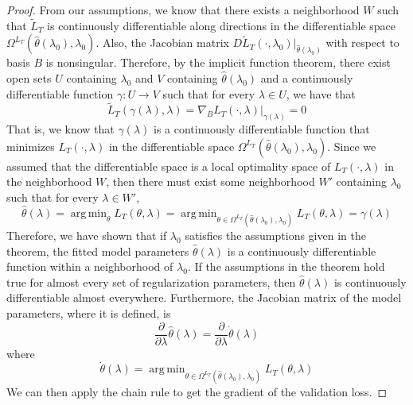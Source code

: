 \documentclass[10pt,letterpaper]{article}
\DeclareMathOperator*{\argmin}{arg\,min}
\begin{document}
\begin{proof}
From our assumptions, we know that there exists a neighborhood $W$ such that $\tilde L_T$ is continuously differentiable along directions in the differentiable space $\Omega^{L_T}(\hat \theta(\lambda_0), \lambda_0)$. Also, the Jacobian matrix $D \tilde L_T(\cdot, \lambda_0)|_{\hat \theta(\lambda_0)}$ with respect to basis $B$ is nonsingular. Therefore, by the implicit function theorem, there exist open sets $U$ containing $\lambda_0$ and $V$ containing $\hat \theta(\lambda_0)$ and a continuously differentiable function $\gamma: U \rightarrow V$ such that for every $\lambda \in U$, we have that 
\begin{equation}
\tilde L_T(\gamma(\lambda), \lambda) = \nabla_{B} L_T(\cdot, \lambda)|_{\gamma(\lambda)} = 0
\end{equation}
That is, we know that $\gamma(\lambda)$ is a continuously differentiable function that minimizes $L_T(\cdot, \lambda)$ in the differentiable space  $\Omega^{L_T}(\hat \theta(\lambda_0), \lambda_0)$.
Since we assumed that the differentiable space is a local optimality space of $L_T(\cdot, \lambda)$ in the neighborhood $W$, then there must exist some neighborhood $W'$ containing $\lambda_0$ such that for every $\lambda \in W'$, 
\begin{equation}
\hat \theta(\lambda) =
\argmin_\theta L_T(\theta, \lambda) =
\argmin_{\theta \in \Omega^{L_T}(\hat \theta(\lambda_0), \lambda_0)} L_T(\theta, \lambda) =
\gamma(\lambda)
\end{equation}
Therefore, we have shown that if $\lambda_0$ satisfies the assumptions given in the theorem, the fitted model parameters $\hat \theta(\lambda)$ is a continuously differentiable function within a neighborhood of $\lambda_0$. If the assumptions in the theorem hold true for almost every set of regularization parameters, then $\hat \theta(\lambda)$ is continuously differentiable almost everywhere. Furthermore, the Jacobian matrix of the model parameters, where it is defined, is
\begin{equation}
\frac{\partial}{\partial \lambda} \hat \theta(\lambda) = \frac{\partial}{\partial \lambda} \dot \theta(\lambda)
\end{equation}
where 
\begin{equation}
\dot \theta(\lambda) = \argmin_{\theta \in \Omega^{L_T}(\hat \theta(\lambda_0), \lambda_0)} L_T(\theta, \lambda)
\end{equation}
We can then apply the chain rule to get the gradient of the validation loss.
\end{proof}
\end{document}
